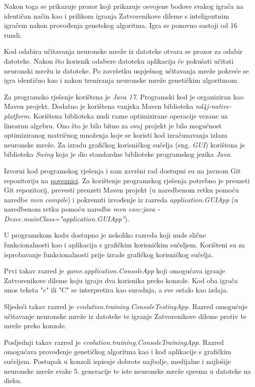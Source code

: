 \documentclass[zavrsnirad]{fer}
\begin{document}
	Nakon toga se prikazuje prozor koji prikazuje osvojene bodove svakog igrača na identičan način kao i prilikom igranja Zatvorenikove dileme s inteligentnim igračem nakon provođenja genetskog algoritma. Igra se ponovno sastoji od 16 rundi.
	
	Kod odabira učitavanja neuronske mreže iz datoteke otvara se prozor za odabir datoteke. Nakon što korisnik odabere datoteku aplikacija će pokušati učitati neuronski mrežu iz datoteke. Po završetku uspješnog učitavanja mreže pokreće se igra identično kao i nakon treniranja neuronske mreže genetičkim algoritmom.
	
	Za programsko rješenje korištena je \textit{Java 17}. Programski kod je organiziran kao Maven projekt. Dodatno je korištena vanjska Maven biblioteka \textit{nd4j-native-platform}. Korištena biblioteka nudi razne optimizirane operacije vezane uz linearnu algebru. Ono što je bilo bitno za ovaj projekt je bilo mogućnost optimiziranog matričnog množenja koje se koristi kod izračunavanja izlaza neuronske mreže. Za izradu grafičkog korisničkog sučelja (eng. \textit{GUI}) korištena je biblioteka \textit{Swing} koja je dio standardne biblioteke programskog jezika \textit{Java}.
	
	Izvorni kod programskog rješenja i sam završni rad dostupni su na javnom Git repozitoriju na \href{https://github.com/PetarBelosevic/Prisoner-s-Dilemma-AI.git}{poveznici}. Za korištenje programskog rješenja potrebno je preuzeti Git repozitorij, prevesti preuzeti Maven projekt (u naredbenom retku pomoću naredbe \textit{mvn compile}) i pokrenuti izvođenje iz razreda \textit{application.GUIApp} (u naredbenom retku pomoću naredbe \textit{mvn exec:java -Dexec.mainClass="application.GUIApp"}).
	
	U programskom kodu dostupno je nekoliko razreda koji nude slične funkcionalnosti kao i aplikacija s grafičkim korisničkim sučeljem. Korišteni su za isprobavanje funkcionalnosti prije izrade grafičkog korisničkog sučelja.
	
	Prvi takav razred je \textit{game.application.ConsoleApp} koji omogućava igranje Zatvorenikove dileme koju igraju dva korisnika preko konzole. Kod oba igrača unos teksta "c" ili "C" se interpretira kao suradnja, a sve ostalo kao izdaja.
	
	Sljedeći takav razred je \textit{evolution.training.ConsoleTestingApp}. Razred omogućuje učitavanje neuronske mreže iz datoteke te igranje Zatvorenikove dileme protiv te mreže preko konzole.
	
	Posljednji takav razred je \textit{evolution.training.ConsoleTrainingApp}. Razred omogućava provođenje genetičkog algoritma kao i kod aplikacije s grafičkim sučeljem. Postupak u konzoli ispisuje dobrote najbolje, medijalne i najlošije neuronske mreže svake 5. generacije te iste neuronske mreže sprema u datoteke na disku.

\end{document}
